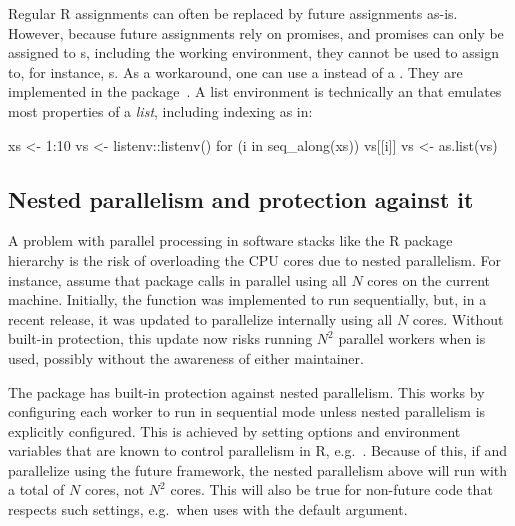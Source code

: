 Regular R assignments can often be replaced by future assignments
as-is.  However, because future assignments rely on promises, and
promises can only be assigned to s, including the
working environment, they cannot be used to assign to, for
instance, s.  As a workaround, one can use a  instead of a .  They are implemented in
the  package~\citep{CRAN:listenv}.  A list
environment is technically an  that emulates most 
properties of a \emph{list}, including indexing as in:
\begin{example}
xs <- 1:10
vs <- listenv::listenv()
for (i in seq_along(xs)) {
  vs[[i]] %
}
vs <- as.list(vs)
\end{example}


\subsection{Nested parallelism and protection against it}
\label{protection-against-nested-parallelism}

A problem with parallel processing in software stacks like the R
package hierarchy is the risk of overloading the CPU cores due to
nested parallelism. For instance, assume that package  calls
 in parallel using all $N$ cores on the
current machine. Initially, the  function was
implemented to run sequentially, but, in a recent  release,
it was updated to parallelize internally using all $N$ cores.  Without
built-in protection, this update now risks running $N^2$ parallel
workers when  is used, possibly without the awareness of
either maintainer.

The  package has built-in protection against nested
parallelism. This works by configuring each worker to run in
sequential mode unless nested parallelism is explicitly configured.
This is achieved by setting options and environment variables that are
known to control parallelism in R,
e.g.\ .  Because of this, if 
and  parallelize using the future framework, the nested
parallelism above will run with a total of $N$ cores, not $N^2$ cores.
This will also be true for non-future code that respects such
settings, e.g.\ when  uses  with
the default  argument.

